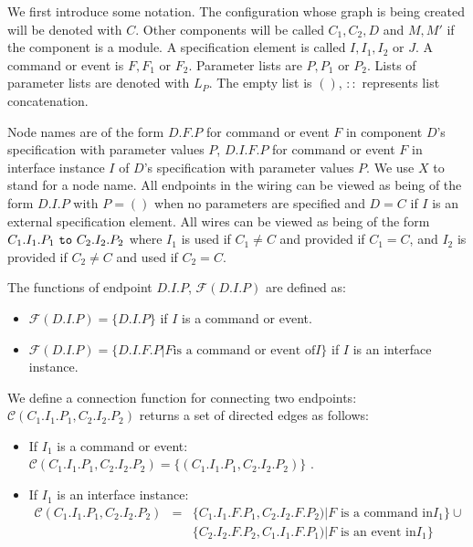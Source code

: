 \documentclass[11pt]{article}
\newcommand{\kw}[1]{{\tt #1}}
\newcommand{\FSE}{\mathcal{F}}
\newcommand{\connect}{\mathcal{C}}
\begin{document}
We first introduce some notation. The configuration whose graph is being
created will be denoted with $C$. Other components will be called $C_1,
C_2, D$ and $M, M'$ if the component is a module. A specification element
is called $I, I_1, I_2$ or $J$.  A command or event is $F, F_1$ or
$F_2$. Parameter lists are $P, P_1$ or $P_2$. Lists of parameter lists are
denoted with $L_P$. The empty list is $()$, $::$ represents list
concatenation.

Node names are of the form $D.F.P$ for command or event $F$ in component
$D$'s specification with parameter values $P$, $D.I.F.P$ for command or
event $F$ in interface instance $I$ of $D$'s specification with parameter
values $P$. We use $X$ to stand for a node name. All endpoints in the
wiring can be viewed as being of the form $D.I.P$ with $P = ()$ when no
parameters are specified and $D = C$ if $I$ is an external specification
element.  All wires can be viewed as being of the form $C_1.I_1.P_1 \kw{\
to\ } C_2.I_2.P_2$ where $I_1$ is used if $C_1 \not= C$ and provided if
$C_1 = C$, and $I_2$ is provided if $C_2 \not= C$ and used if $C_2 = C$.

The functions of endpoint $D.I.P$, $\FSE(D.I.P)$ are defined as:
\begin{itemize}
\item $\FSE(D.I.P) = \{ D.I.P \}$ if $I$ is a command or event.
\item $\FSE(D.I.P) = \{ D.I.F.P | F \mbox{is a command or event of} I \}$ if
$I$ is an interface instance.
\end{itemize}

We define a connection function for connecting two endpoints:
$\connect(C_1.I_1.P_1, C_2.I_2.P_2)$ returns a set of directed edges as
follows:
\begin{itemize}
\item If $I_1$ is a command or event: $\connect(C_1.I_1.P_1, C_2.I_2.P_2) = \{ (C_1.I_1.P_1, C_2.I_2.P_2)
\}$ .
\item If $I_1$ is an interface instance: 
\begin{eqnarray*}
\connect(C_1.I_1.P_1, C_2.I_2.P_2) & = &
\{ C_1.I_1.F.P_1, C_2.I_2.F.P_2) | F \mbox{ is a command in} I_1 \} \cup \\
& & \{ C_2.I_2.F.P_2, C_1.I_1.F.P_1) | F \mbox{ is an event in} I_1 \}
\end{eqnarray*}
\end{itemize}
\end{document}
